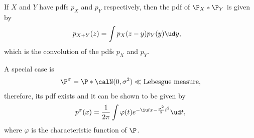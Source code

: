 \documentclass[../aipt.tex]{subfiles}
\begin{document}
If $X$ and $Y$ have pdfs $p_X$ and $p_Y$ respectively, then the pdf of $\P_X *\P_Y$ is given by 
\begin{align*}
p_{X+Y}(z)	& = \int p_X(z-y)	p_Y(y) \ud y,
\end{align*}
which is the convolution of the pdfs $p_X$ and $p_Y$. 

A special case is
\begin{align*}
\P^{\sigma}= {\P} * \calN (0,\sigma^2)\ll \text{Lebesgue measure}, 
\end{align*}
therefore, its pdf exists and it can be shown to be given by 
\begin{align}\label{wk10:psigma}
p^{\sigma}(x)=\frac{1}{2\pi}\int \varphi(t) e^{-\iu tx-\frac{\sigma^2}{2}t^2} \ud t,
\end{align}
where $\varphi$ is the characteristic function of $\P$.
\end{document}
